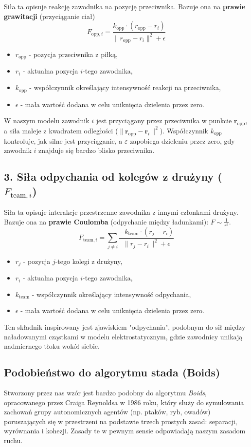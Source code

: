 \documentclass{article}
\begin{document}
Siła ta opisuje reakcję zawodnika na pozycję przeciwnika. Bazuje ona na \textbf{prawie grawitacji} (przyciąganie ciał)
\[
F_{\text{opp}, i} = \frac{k_{\text{opp}} \cdot (r_{\text{opp}} - r_i)}{\|r_{\text{opp}} - r_i\|^2 + \epsilon}
\]
\begin{itemize}
    \item \(r_{\text{opp}}\) - pozycja przeciwnika z piłką,
    \item \(r_i\) - aktualna pozycja \(i\)-tego zawodnika,
    \item \(k_{\text{opp}}\) - współczynnik określający intensywność reakcji na przeciwnika,
    \item \(\epsilon\) - mała wartość dodana w celu uniknięcia dzielenia przez zero.
\end{itemize}
W naszym modelu zawodnik $i$ jest przyciągany przez przeciwnika w punkcie $\mathbf{r}_{\text{opp}}$, a siła maleje z kwadratem odległości ($\|\mathbf{r}_{\text{opp}} - \mathbf{r}_i\|^2$). Współczynnik $k_{\text{opp}}$ kontroluje, jak silne jest przyciąganie, a $\varepsilon$ zapobiega dzieleniu przez zero, gdy zawodnik $i$ znajduje się bardzo blisko przeciwnika.

\subsection*{3. Siła odpychania od kolegów z drużyny (\(F_{\text{team}, i}\))}

Siła ta opisuje interakcje przestrzenne zawodnika z innymi członkami drużyny. Bazuje ona na \textbf{prawie Coulomba} (odpychanie między ładunkami): \(F \sim \frac{1}{r^2}\).
\[
F_{\text{team}, i} = \sum_{j \neq i} \frac{-k_{\text{team}} \cdot (r_j - r_i)}{\|r_j - r_i\|^2 + \epsilon}
\]
\begin{itemize}
    \item \(r_j\) - pozycja \(j\)-tego kolegi z drużyny,
    \item \(r_i\) - aktualna pozycja \(i\)-tego zawodnika,
    \item \(k_{\text{team}}\) - współczynnik określający intensywność odpychania,
    \item \(\epsilon\) - mała wartość dodana w celu uniknięcia dzielenia przez zero.
\end{itemize}
Ten składnik inspirowany jest zjawiskiem "odpychania", podobnym do sił między naładowanymi cząstkami w modelu elektrostatycznym, gdzie zawodnicy unikają nadmiernego tłoku wokół siebie.

\subsection*{Podobieństwo do algorytmu stada \textbf{(Boids)}}
Stworzony przez nas wzór jest bardzo podobny do algorytmu \textit{Boids}, opracowanego przez Craiga Reynoldsa w 1986 roku, który służy do symulowania zachowań grupy autonomicznych agentów (np. ptaków, ryb, owadów) poruszających się w przestrzeni na podstawie trzech prostych zasad: separacji, wyrównania i kohezji. Zasady te w pewnym sensie odpowiadają naszym zasadom ruchu.
\end{document}
